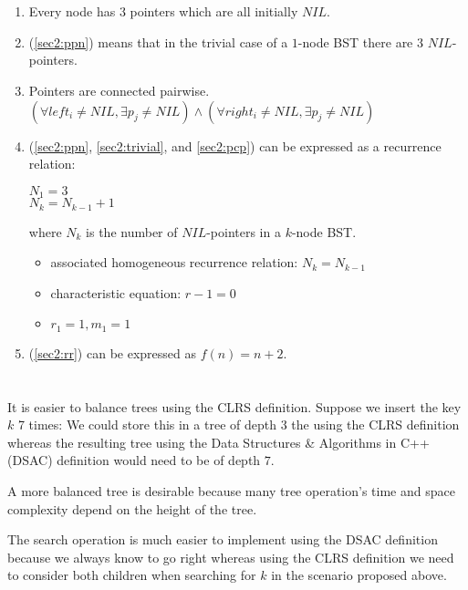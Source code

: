 \documentclass[12pt, a4paper]{article}
\begin{document}
\section{} %
\begin{enumerate}
	\item Every node has $3$ pointers which are all initially $NIL$.
	\label{sec2:ppn}

	\item (\ref{sec2:ppn}) means that in the trivial case of a $1$-node BST there are $3$ $NIL$-pointers.
	\label{sec2:trivial}

	\item Pointers are connected pairwise. $(\forall left_i \neq NIL, \exists p_j \neq NIL) \land (\forall right_i \neq NIL, \exists p_j \neq NIL)$
	\label{sec2:pcp}

	\item (\ref{sec2:ppn}, \ref{sec2:trivial}, and \ref{sec2:pcp}) can be expressed as a recurrence relation:

	$N_1 = 3$\\
	$N_k = N_{k - 1} + 1$

	where $N_k$ is the number of $NIL$-pointers in a $k$-node BST.

	\begin{itemize}
		\item associated homogeneous recurrence relation: $N_k = N_{k - 1}$
		\item characteristic equation: $r - 1 = 0$
		\item $r_1 = 1, m_1 = 1$
	\end{itemize}
	\label{sec2:rr}

	\item (\ref{sec2:rr}) can be expressed as $f(n) = n + 2$.
\end{enumerate}

\section{} %
\section{} %
It is easier to balance trees using the CLRS definition. Suppose we insert the key $k$ 7 times: We could store this in a tree of depth $3$ the using the CLRS definition whereas the resulting tree using the Data Structures \& Algorithms in C++ (DSAC) definition would need to be of depth $7$.

A more balanced tree is desirable because many tree operation's time and space complexity depend on the height of the tree.

The search operation is much easier to implement using the DSAC definition because we always know to go right whereas using the CLRS definition we need to consider both children when searching for $k$ in the scenario proposed above.

\section{} %
\end{document}
